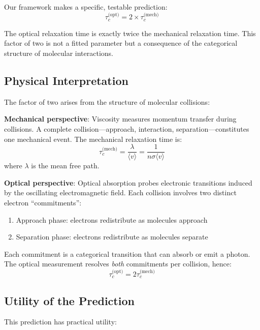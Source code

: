 \documentclass[twocolumn,10pt]{article}
\theoremstyle{definition}
\theoremstyle{remark}
\begin{document}
Our framework makes a specific, testable prediction:
\begin{equation}
\boxed{\tau_c^{\text{(opt)}} = 2 \times \tau_c^{\text{(mech)}}}
\label{eq:central_prediction}
\end{equation}

The optical relaxation time is exactly twice the mechanical relaxation time. This factor of two is not a fitted parameter but a consequence of the categorical structure of molecular interactions.

\subsection{Physical Interpretation}

The factor of two arises from the structure of molecular collisions:

\textbf{Mechanical perspective}: Viscosity measures momentum transfer during collisions. A complete collision---approach, interaction, separation---constitutes one mechanical event. The mechanical relaxation time is:
\begin{equation}
\tau_c^{\text{(mech)}} = \frac{\lambda}{\langle v \rangle} = \frac{1}{n \sigma \langle v \rangle}
\end{equation}
where $\lambda$ is the mean free path.

\textbf{Optical perspective}: Optical absorption probes electronic transitions induced by the oscillating electromagnetic field. Each collision involves two distinct electron ``commitments'':
\begin{enumerate}
\item Approach phase: electrons redistribute as molecules approach
\item Separation phase: electrons redistribute as molecules separate
\end{enumerate}

Each commitment is a categorical transition that can absorb or emit a photon. The optical measurement resolves \textit{both} commitments per collision, hence:
\begin{equation}
\tau_c^{\text{(opt)}} = 2 \tau_c^{\text{(mech)}}
\end{equation}

\subsection{Utility of the Prediction}

This prediction has practical utility:
\end{document}
